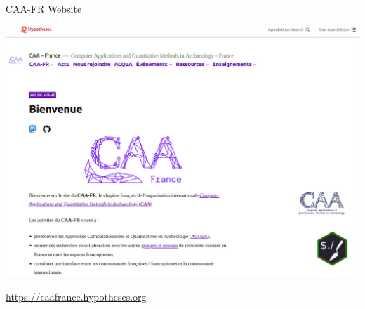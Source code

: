 \documentclass[xcolor=dvipsnames, 10pt, french, american]{beamer}
\begin{document}
 
\begin{frame}
	\begin{block}{CAA-FR Website}
        \begin{center}
            \includegraphics[height=0.6\textheight]{figures/caa-fr-website}
        \end{center}
        \url{https://caafrance.hypotheses.org}
	\end{block}
\end{frame}
\end{document}
